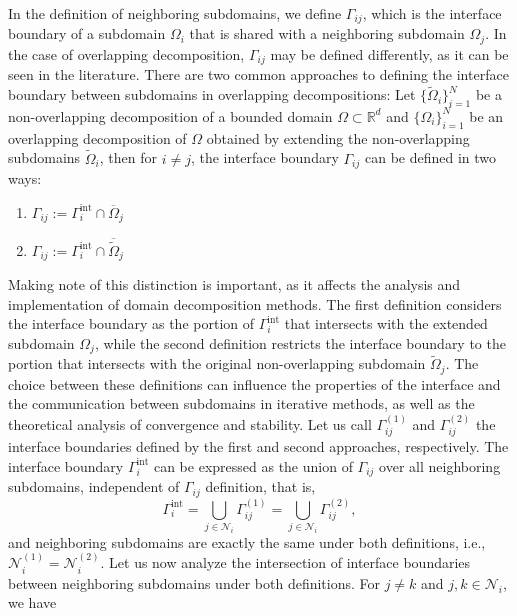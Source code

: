 \documentclass[a4paper, 11pt]{article}
\theoremstyle{remark}
\begin{document}
In the definition of neighboring subdomains, we define $\Gamma_{ij}$, which is the interface boundary of a subdomain $\Omega_i$ that is shared with a neighboring 
subdomain $\Omega_j$. In the case of overlapping decomposition, $\Gamma_{ij}$ may be defined differently, as it can be seen in the literature. There are two common 
approaches to defining the interface boundary between subdomains in overlapping decompositions: Let $\{\widetilde{\Omega}_i\}_{i=1}^N$ be a non-overlapping decomposition of a bounded 
domain $\Omega \subset \mathbb{R}^d$ and $\{\Omega_i\}_{i=1}^N$ be an overlapping decomposition of $\Omega$ obtained by extending the non-overlapping subdomains 
$\widetilde{\Omega}_i$, then for $i \neq j$, the interface boundary $\Gamma_{ij}$ can be defined in two ways:
\begin{enumerate}[label=(\arabic*)]
    \item $\Gamma_{ij} := \Gamma_{i}^{\text{int}} \cap \overline{\Omega}_j$
    \item $\Gamma_{ij} := \Gamma_{i}^{\text{int}} \cap \overline{\widetilde{\Omega}}_j$
\end{enumerate}
Making note of this distinction is important, as it affects the analysis and implementation of domain decomposition methods. The first definition considers the 
interface boundary as the portion of $\Gamma_i^{\text{int}}$ that intersects with the extended subdomain $\Omega_j$, while the second definition restricts the 
interface boundary to the portion that intersects with the original non-overlapping subdomain $\widetilde{\Omega}_j$. The choice between these definitions can 
influence the properties of the interface and the communication between subdomains in iterative methods, as well as the theoretical analysis of convergence and 
stability. Let us call $\Gamma_{ij}^{(1)}$ and $\Gamma_{ij}^{(2)}$ the interface boundaries defined by the first and second approaches, respectively. The interface 
boundary $\Gamma_i^{\text{int}}$ can be expressed as the union of $\Gamma_{ij}$ over all neighboring subdomains, independent of $\Gamma_{ij}$ definition, that is,
\begin{equation*}
    \Gamma_i^{\text{int}} = \bigcup_{j \in \mathcal{N}_i} \Gamma_{ij}^{(1)} = \bigcup_{j \in \mathcal{N}_i} \Gamma_{ij}^{(2)},
\end{equation*}  
and neighboring subdomains are exactly the same under both definitions, i.e., $\mathcal{N}_i^{(1)} = \mathcal{N}_i^{(2)}$. Let us now analyze the intersection 
of interface boundaries between neighboring subdomains under both definitions. For $j \neq k$ and $j, k \in \mathcal{N}_i$, we have
\end{document}
